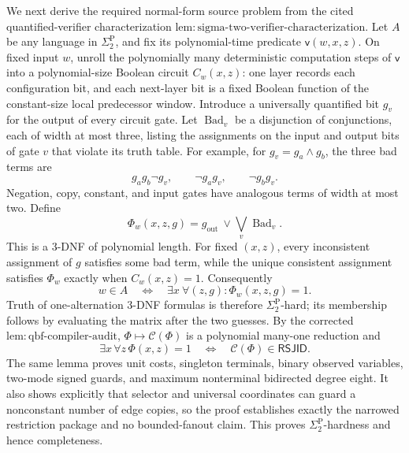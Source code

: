 We next derive the required normal-form source problem from the cited quantified-verifier characterization \(\mathrm{lem{:}sigma\text{-}two\text{-}verifier\text{-}characterization}\).  Let \(A\) be any language in \(\Sigma_2^{\mathrm P}\), and fix its polynomial-time predicate \(\mathsf v(w,x,z)\).  On fixed input \(w\), unroll the polynomially many deterministic computation steps of \(\mathsf v\) into a polynomial-size Boolean circuit \(C_w(x,z)\): one layer records each configuration bit, and each next-layer bit is a fixed Boolean function of the constant-size local predecessor window.  Introduce a universally quantified bit \(g_v\) for the output of every circuit gate.  Let \(\operatorname{Bad}_v\) be a disjunction of conjunctions, each of width at most three, listing the assignments on the input and output bits of gate \(v\) that violate its truth table.  For example, for \(g_v=g_a\wedge g_b\), the three bad terms are
\[
 g_a g_b\neg g_v,\qquad \neg g_a g_v,\qquad \neg g_b g_v.
\]
Negation, copy, constant, and input gates have analogous terms of width at most two.  Define
\[
 \Phi_w(x,z,g)=g_{\mathrm{out}}\ \vee\!\bigvee_v\operatorname{Bad}_v.
\]
This is a \(3\)-DNF of polynomial length.  For fixed \((x,z)\), every inconsistent assignment of \(g\) satisfies some bad term, while the unique consistent assignment satisfies \(\Phi_w\) exactly when \(C_w(x,z)=1\).  Consequently
\[
 w\in A
 \quad\Longleftrightarrow\quad
 \exists x\ \forall(z,g):\Phi_w(x,z,g)=1.
\]
Truth of one-alternation \(3\)-DNF formulas is therefore \(\Sigma_2^{\mathrm P}\)-hard; its membership follows by evaluating the matrix after the two guesses.  By the corrected \(\mathrm{lem{:}qbf\text{-}compiler\text{-}audit}\), \(\Phi\mapsto\mathcal C(\Phi)\) is a polynomial many-one reduction and
\[
 \exists x\,\forall z\,\Phi(x,z)=1
 \quad\Longleftrightarrow\quad
 \mathcal C(\Phi)\in\mathsf{RSJID}.
\]
The same lemma proves unit costs, singleton terminals, binary observed variables, two-mode signed guards, and maximum nonterminal bidirected degree eight.  It also shows explicitly that selector and universal coordinates can guard a nonconstant number of edge copies, so the proof establishes exactly the narrowed restriction package and no bounded-fanout claim.  This proves \(\Sigma_2^{\mathrm P}\)-hardness and hence completeness.

